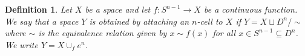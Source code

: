 \documentclass[11pt, letterpaper, oneside]{report}
\theoremstyle{pplain}
\theoremstyle{ddefinition}
\newtheorem{definition}[theorem]{Definition}
\theoremstyle{nnn}
\theoremstyle{eexercise}
\begin{document}
\begin{definition}
Let $X$ be a space and let $f\colon S^{n-1} \to X$ be a continuous function. 
We say that a space $Y$ is obtained by \emph{attaching an $n$-cell}
to $X$ if $Y = X \sqcup D^{n}/{\sim}$
where $\sim$ is the equivalence relation given by $x\sim f(x)$ for all $x\in S^{n-1}\subseteq D^{n}$. 
We write $Y = X \cup_{f} e^{n}$. 


\end{definition}
\end{document}

